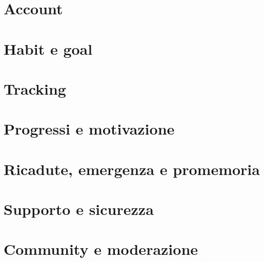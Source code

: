 \documentclass[a4paper]{article}
\begin{document}
\centering
\newcommand{\diagramma}[2]{%
  \section*{#1}\vfill
  \vfill\clearpage}

\diagramma{Account}{01-account}
\diagramma{Habit e goal}{02-habit-and-goal}
\diagramma{Tracking}{03-tracking}
\diagramma{Progressi e motivazione}{04-progress-and-motivation}
\diagramma{Ricadute, emergenza e promemoria}{05-relapse-emergency-reminders}
\diagramma{Supporto e sicurezza}{06-support-and-safety}
\diagramma{Community e moderazione}{07-community-and-moderation}
\end{document}
